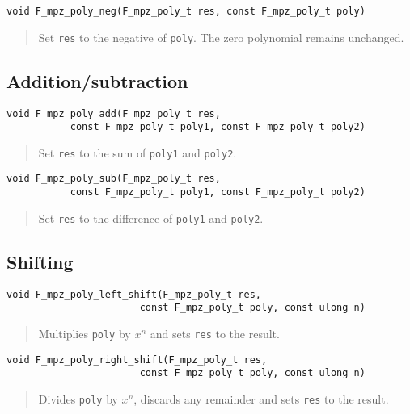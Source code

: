 \documentclass[a4paper,10pt]{article}
\newcommand{\code}{\lstinline}
\begin{document}
\begin{lstlisting}
void F_mpz_poly_neg(F_mpz_poly_t res, const F_mpz_poly_t poly)
\end{lstlisting}
\begin{quote}
Set \code{res} to the negative of \code{poly}. The zero polynomial remains unchanged.
\end{quote}

\subsection{Addition/subtraction}

\begin{lstlisting}
void F_mpz_poly_add(F_mpz_poly_t res, 
           const F_mpz_poly_t poly1, const F_mpz_poly_t poly2)
\end{lstlisting}
\begin{quote}
Set \code{res} to the sum of \code{poly1} and \code{poly2}.
\end{quote}

\begin{lstlisting}
void F_mpz_poly_sub(F_mpz_poly_t res, 
           const F_mpz_poly_t poly1, const F_mpz_poly_t poly2)
\end{lstlisting}
\begin{quote}
Set \code{res} to the difference of \code{poly1} and \code{poly2}.
\end{quote}

\subsection{Shifting}

\begin{lstlisting}
void F_mpz_poly_left_shift(F_mpz_poly_t res,
                       const F_mpz_poly_t poly, const ulong n)
\end{lstlisting}
\begin{quote}
Multiplies \code{poly} by $x^n$ and sets \code{res} to the result.
\end{quote}

\begin{lstlisting}
void F_mpz_poly_right_shift(F_mpz_poly_t res,
                       const F_mpz_poly_t poly, const ulong n)
\end{lstlisting}
\begin{quote}
Divides \code{poly} by $x^n$, discards any remainder and sets \code{res} to the result.
\end{quote}
\end{document}
